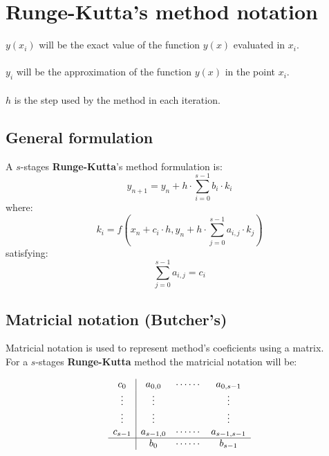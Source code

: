 \section{Runge-Kutta's method notation}

$y(x_i)$ will be the exact value of the function $y(x)$ evaluated in $x_i$.\\ \\
$y_i$ will be the approximation of the function $y(x)$ in the point $x_i$.\\ \\
$h$ is the step used by the method in each iteration.

\subsection{General formulation}

A $s$-stages \textbf{Runge-Kutta}'s method formulation is:
%
\begin{equation}
y_{n+1} = y_{n} + h \cdot \sum_{i=0}^{s-1} b_i \cdot k_i
\end{equation}
%
where:
%
\begin{equation}
k_i = f(x_n + c_i \cdot h, y_n + h \cdot \sum_{j=0}^{s-1} a_{i,j} \cdot k_j)
\end{equation}
%
satisfying:
%
\begin{equation}
\sum_{j=0}^{s-1} a_{i,j} = c_i
\end{equation}

\subsection{Matricial notation (Butcher's)}

Matricial notation is used to represent method's coeficients using a matrix.\\

For a $s$-stages \textbf{Runge-Kutta} method the matricial notation will be:
%
\begin{center}
\begin{displaymath}
\begin{array}{c|ccc}
c_0 & a_{0,0} & \cdots \cdots & a_{0,s-1} \\
\vdots & \vdots & & \vdots \\
\vdots & \vdots & & \vdots \\
c_{s-1} & a_{s-1,0} & \cdots \cdots & a_{s-1,s-1} \\
\hline
 & b_0 & \cdots \cdots & b_{s-1} \\
\end{array}
\end{displaymath}
\end{center}

